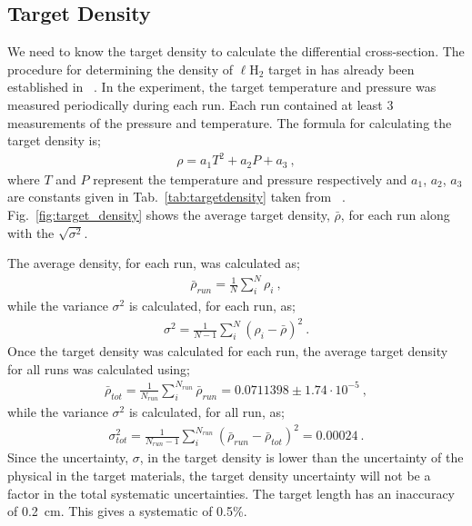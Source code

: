 \subsection{Target Density}\label{sec:analysis.target_density}

We need to know the target density to calculate the differential cross-section. The procedure for determining the density of $\ell$H$_2$ target in  has already been established in ~\cite{clas.target.density}. In the  experiment, the target temperature and pressure was measured periodically during each run. Each run contained at least 3 measurements of the pressure and temperature. The formula for calculating the target density is;
\begin{align}
\rho = a_1T^2 + a_2P +a_3 \label{eq:target_density} \ ,
\end{align}
where $T$ and $P$ represent the temperature and pressure respectively and $a_1$, $a_2$, $a_3$ are constants given in Tab.~\ref{tab:targetdensity} taken from ~\cite{clas.target.density}. Fig.~\ref{fig:target_density} shows the average target density, $\bar \rho$, for each run along with the $\sqrt{\sigma^2}$.

The average density, for each run, was calculated as;
\begin{align}
\bar \rho_{run} = \frac{1}{N}\sum_i^N \rho_i \ ,
\end{align}
while the variance $\sigma^2$ is calculated, for each run, as;
\begin{align}
\sigma^2 = \frac{1}{N - 1}\sum_i^N (\rho_i - \bar \rho)^2 \ .
\end{align}
Once the target density was calculated for each run, the average target density for all  runs was calculated using;
\begin{align}
\bar \rho_{tot} = \frac{1}{N_{run}}\sum_i^{N_{run}} \bar \rho_{run} = 0.0711398 \pm 1.74 \cdot10^{-5}\ ,
\end{align}
while the variance $\sigma^2$ is calculated, for all  run, as;
\begin{align}
\sigma_{tot}^2 = \frac{1}{N_{run} -1}\sum_i^{N_{run}} (\bar \rho_{run} - \bar \rho_{tot})^2 = 0.00024 \ .
\end{align}
Since the uncertainty, $\sigma$, in the target density is lower than the uncertainty of the physical in the target materials, the target density uncertainty will not be a factor in the total systematic uncertainties. The target length has an inaccuracy of 0.2~cm. This gives a systematic of 0.5\%.

